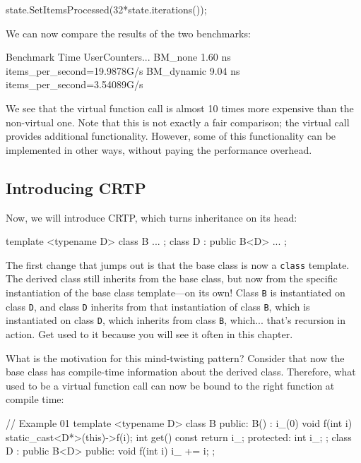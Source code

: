 \begin{code}
state.SetItemsProcessed(32*state.iterations());
\end{code}

We can now compare the results of the two benchmarks:

\begin{code}
Benchmark           Time UserCounters...
BM_none          1.60 ns items_per_second=19.9878G/s
BM_dynamic       9.04 ns items_per_second=3.54089G/s
\end{code}

We see that the virtual function call is almost 10 times more expensive than the non-virtual one. Note that this is not exactly a fair comparison; the virtual call provides additional functionality. However, some of this functionality can be implemented in other ways, without paying the performance overhead.

\subsection{Introducing CRTP}

Now, we will introduce CRTP, which turns inheritance on its head:

\begin{code}
template <typename D> class B {
  ...
};
class D : public B<D> {
  ...
};
\end{code}

The first change that jumps out is that the base class is now a \texttt{class} template. The derived class still inherits from the base class, but now from the specific instantiation of the base class template---on its own! Class \texttt{B} is instantiated on class \texttt{D}, and class \texttt{D} inherits from that instantiation of class \texttt{B}, which is instantiated on class \texttt{D}, which inherits from class \texttt{B}, which... that's recursion in action. Get used to it because you will see it often in this chapter.

What is the motivation for this mind-twisting pattern? Consider that now the base class has compile-time information about the derived class. Therefore, what used to be a virtual function call can now be bound to the right function at compile time:

\begin{code}
// Example 01
template <typename D> class B {
  public:
  B() : i_(0) {}
  void f(int i) { static_cast<D*>(this)->f(i); }
  int get() const { return i_; }
  protected:
  int i_;
};
class D : public B<D> {
  public:
  void f(int i) { i_ += i; }
};
\end{code}

